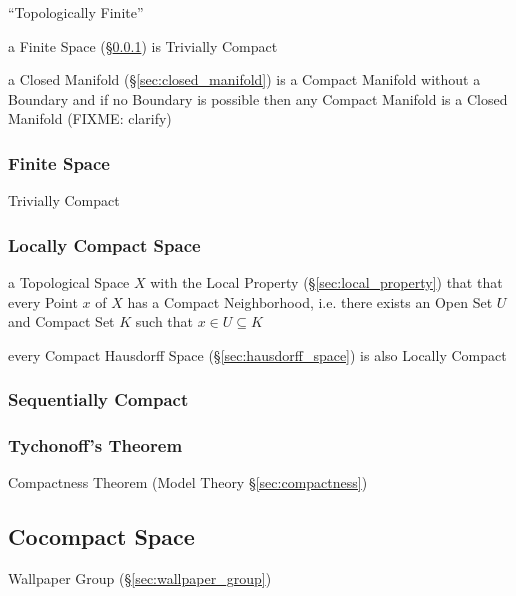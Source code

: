 ``Topologically Finite''

a Finite Space (\S\ref{sec:finite_space}) is Trivially Compact

\fist a Closed Manifold (\S\ref{sec:closed_manifold}) is a Compact Manifold
without a Boundary and if no Boundary is possible then any Compact Manifold
is a Closed Manifold (FIXME: clarify)



\subsubsection{Finite Space}\label{sec:finite_space}

Trivially Compact



\subsubsection{Locally Compact Space}\label{sec:locally_compact}

a Topological Space $X$ with the Local Property (\S\ref{sec:local_property})
that that every Point $x$ of $X$ has a Compact Neighborhood, i.e. there exists
an Open Set $U$ and Compact Set $K$ such that $x \in U \subseteq K$

every Compact Hausdorff Space (\S\ref{sec:hausdorff_space}) is also Locally
Compact



\subsubsection{Sequentially Compact}\label{sec:sequentially_compact}

\subsubsection{Tychonoff's Theorem}\label{sec:tychonoffs_theorem}

Compactness Theorem (Model Theory \S\ref{sec:compactness})



\subsection{Cocompact Space}\label{sec:cocompact_space}

Wallpaper Group (\S\ref{sec:wallpaper_group})

